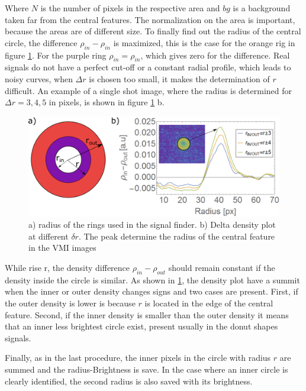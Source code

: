 Where $N$ is the number of pixels in the respective area and $bg$ is a background taken far from the central features. The normalization on the area is important, because the areas are of different size. To finally find out the radius of the central circle, the difference $\rho_{in}-\rho_{in}$ is maximized, this is the case for the orange rig in figure \ref{fig:density_plot}. For the purple ring $\rho_{in} = \rho_{in}$, which gives zero for the difference.
Real signals do not have a perfect cut-off or a constant radial profile, which leads to noisy curves, when $\Delta r$ is chosen too small, it makes the determination of $r$ difficult. An example of a single shot image, where the radius is determined for $\Delta r = 3,4,5$ in pixels, is shown in figure \ref{fig:density_plot} b. 

\begin{figure}
\centering
\includegraphics[width=1\textwidth]{../images/density_plot.png}
\caption[Signal finder density plot]{a) radius of the rings used in the signal finder. b) Delta density plot at different $\delta r$. The peak determine the radius of the central feature in the VMI images}
\label{fig:density_plot}
\end{figure}

While rise r, the density difference $\rho_{in} - \rho_{out}$ should remain constant if the density inside the circle is similar. As shown in \ref{fig:density_plot}, the density plot have a summit when the inner or outer density changes signs and two cases are present. First, if the outer density is lower is because $r$ is located in the edge of the central feature. Second, if the inner density is smaller than the outer density it means that an inner less brightest circle exist, present usually in the donut shapes signals. 

Finally, as in the last procedure, the inner pixels in the circle with radius $r$ are summed and the radius-Brightness is save. In the case where an inner circle is clearly identified, the second radius is also saved with its brightness.

